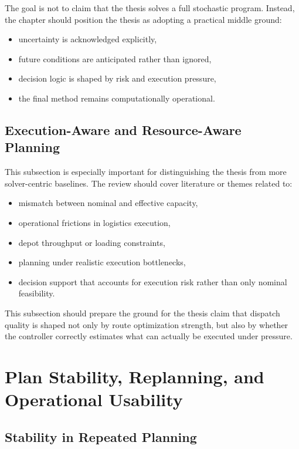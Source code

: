 The goal is not to claim that the thesis solves a full stochastic program. Instead, the chapter should position the thesis as adopting a practical middle ground:

\begin{itemize}
    \item uncertainty is acknowledged explicitly,
    \item future conditions are anticipated rather than ignored,
    \item decision logic is shaped by risk and execution pressure,
    \item the final method remains computationally operational.
\end{itemize}

\subsection{Execution-Aware and Resource-Aware Planning}

This subsection is especially important for distinguishing the thesis from more solver-centric baselines. The review should cover literature or themes related to:

\begin{itemize}
    \item mismatch between nominal and effective capacity,
    \item operational frictions in logistics execution,
    \item depot throughput or loading constraints,
    \item planning under realistic execution bottlenecks,
    \item decision support that accounts for execution risk rather than only nominal feasibility.
\end{itemize}

This subsection should prepare the ground for the thesis claim that dispatch quality is shaped not only by route optimization strength, but also by whether the controller correctly estimates what can actually be executed under pressure.

\section{Plan Stability, Replanning, and Operational Usability}

\subsection{Stability in Repeated Planning}

